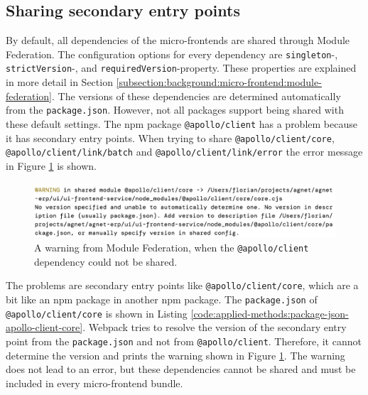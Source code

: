 \subsection{Sharing secondary entry points}\label{subsection:applied-methods:prototypical-implementation:sharing
-secondary-entrypoints}

By default, all dependencies of the micro-frontends are shared through Module Federation. The configuration options for every dependency are \texttt{singleton}-, \texttt{strictVersion}-, and \texttt{requiredVersion}-property. These properties are explained in more detail in Section \ref{subsection:background:micro-frontend:module-federation}. The versions of these dependencies are determined automatically from the \texttt{package.json}. However, not all packages support being shared with these default settings. The npm package \texttt{@apollo/client} has a problem because it has secondary entry points. When trying to share \texttt{@apollo/client/core}, \texttt{@apollo/client/link/batch} and \texttt{@apollo/client/link/error} the error message in Figure \ref{fig:applied-methods:sharing-secondary-entrypoints-error} is shown.

\ifshowImages
  \begin{figure}[H]
  \centering
  \includegraphics[width=1\linewidth]{images/applied-methods/prototypical-implementation/module-federation-apollo-warning.jpg}
  \caption{A warning from Module Federation, when the  \texttt{@apollo/client} dependency could not be shared.}\label{fig:applied-methods:sharing-secondary-entrypoints-error}
  \end{figure}
\fi

\noindent The problems are secondary entry points like \texttt{@apollo/client/core}, which are a bit like an npm package in another npm package. The \texttt{package.json} of \texttt{@apollo/client/core} is shown in Listing \ref{code:applied-methods:package-json-apollo-client-core}. Webpack tries to resolve the version of the secondary entry point from the \texttt{package.json} and not from \texttt{@apollo/client}. Therefore, it cannot determine the version and prints the warning shown in Figure \ref{fig:applied-methods:sharing-secondary-entrypoints-error}. The warning does not lead to an error, but these dependencies cannot be shared and must be included in every micro-frontend bundle.

